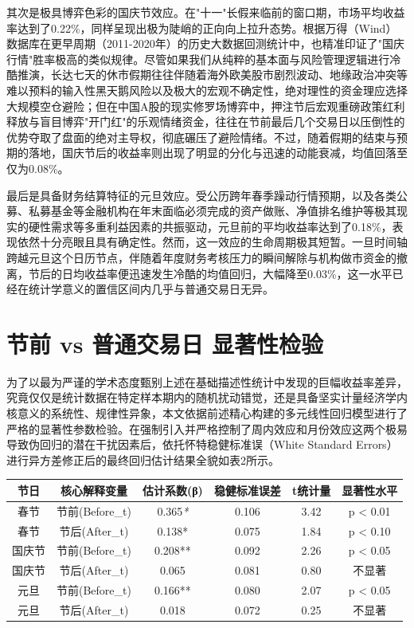 \documentclass{cupb-thesis}
\begin{document}
其次是极具博弈色彩的国庆节效应。在"十一"长假来临前的窗口期，市场平均收益率达到了0.22\%，同样呈现出极为陡峭的正向向上拉升态势。根据万得（Wind）数据库在更早周期（2011-2020年）的历史大数据回测统计中，也精准印证了"国庆行情"胜率极高的类似规律。尽管如果我们从纯粹的基本面与风险管理逻辑进行冷酷推演，长达七天的休市假期往往伴随着海外欧美股市剧烈波动、地缘政治冲突等难以预料的输入性黑天鹅风险以及极大的宏观不确定性，绝对理性的资金理应选择大规模空仓避险；但在中国A股的现实修罗场博弈中，押注节后宏观重磅政策红利释放与盲目博弈"开门红"的乐观情绪资金，往往在节前最后几个交易日以压倒性的优势夺取了盘面的绝对主导权，彻底碾压了避险情绪。不过，随着假期的结束与预期的落地，国庆节后的收益率则出现了明显的分化与迅速的动能衰减，均值回落至仅为0.08\%。


最后是具备财务结算特征的元旦效应。受公历跨年春季躁动行情预期，以及各类公募、私募基金等金融机构在年末面临必须完成的资产做账、净值排名维护等极其现实的硬性需求等多重利益因素的共振驱动，元旦前的平均收益率达到了0.18\%，表现依然十分亮眼且具有确定性。然而，这一效应的生命周期极其短暂。一旦时间轴跨越元旦这个日历节点，伴随着年度财务考核压力的瞬间解除与机构做市资金的撤离，节后的日均收益率便迅速发生冷酷的均值回归，大幅降至0.03\%，这一水平已经在统计学意义的置信区间内几乎与普通交易日无异。


\section{节前 vs 普通交易日 显著性检验}


为了以最为严谨的学术态度甄别上述在基础描述性统计中发现的巨幅收益率差异，究竟仅仅是统计数据在特定样本期内的随机扰动错觉，还是具备坚实计量经济学内核意义的系统性、规律性异象，本文依据前述精心构建的多元线性回归模型进行了严格的显著性参数检验。在强制引入并严格控制了周内效应和月份效应这两个极易导致伪回归的潜在干扰因素后，依托怀特稳健标准误（White Standard Errors）进行异方差修正后的最终回归估计结果全貌如表2所示。



\begin{table}[htbp]
  \centering
  \begin{tabular}{cccccc}
    \toprule
    节日 & 核心解释变量 & 估计系数(β) & 稳健标准误差 & t统计量 & 显著性水平 \\
    \midrule
    春节 & 节前(Before\_t) & 0.365\textit{*} & 0.106 & 3.42 & p < 0.01 \\
    春节 & 节后(After\_t) & 0.138* & 0.075 & 1.84 & p < 0.10 \\
    国庆节 & 节前(Before\_t) & 0.208** & 0.092 & 2.26 & p < 0.05 \\
    国庆节 & 节后(After\_t) & 0.065 & 0.081 & 0.80 & 不显著 \\
    元旦 & 节前(Before\_t) & 0.166** & 0.080 & 2.07 & p < 0.05 \\
    元旦 & 节后(After\_t) & 0.018 & 0.072 & 0.25 & 不显著 \\
    \bottomrule
  \end{tabular}
\end{table}
\end{document}
